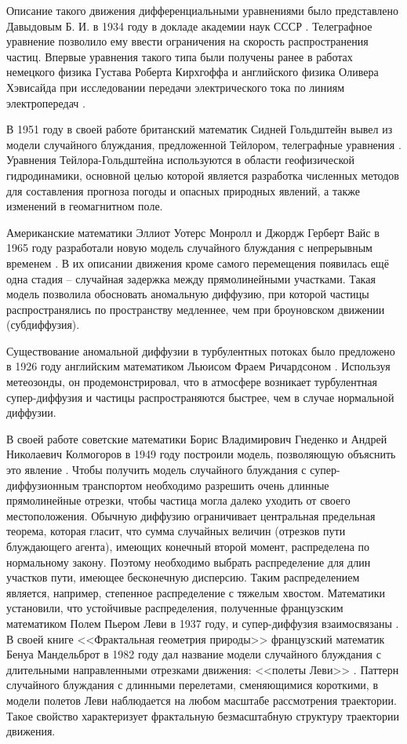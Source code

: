 Описание такого движения дифференциальными уравнениями было представлено Давыдовым Б. И. в 1934 году в докладе академии наук СССР \cite{davydov_diffusion_1934}. Телеграфное уравнение позволило ему ввести ограничения на скорость распространения частиц. Впервые уравнения такого типа были получены ранее в работах немецкого физика Густава Роберта Кирхгоффа и английского физика Оливера Хэвисайда при исследовании передачи электрического тока по линиям электропередач \cite{kirchhoff_ueber_1857}.

В 1951 году в своей работе британский математик Сидней Гольдштейн вывел из модели случайного блуждания, предложенной Тейлором, телеграфные уравнения \cite{goldstein_diffusion_1951}. Уравнения Тейлора-Гольдштейна используются в области геофизической гидродинамики, основной целью которой является разработка численных методов для составления прогноза погоды и опасных природных явлений, а также изменений в геомагнитном поле.

Американские математики Эллиот Уотерс Монролл и Джордж Герберт Вайс в 1965 году разработали новую модель случайного блуждания с непрерывным временем \cite{montroll_random_1965}. В их описании движения кроме самого перемещения появилась ещё одна стадия -- случайная задержка между прямолинейными участками. Такая модель позволила обосновать аномальную диффузию, при которой частицы распространялись по пространству медленнее, чем при броуновском движении (субдиффузия).

Существование аномальной диффузии в турбулентных потоках было предложено в 1926 году английским математиком Льюисом Фраем Ричардсоном \cite{richardson_atmospheric_1997}. Используя метеозонды, он продемонстрировал, что в атмосфере возникает турбулентная супер-диффузия и частицы распространяются быстрее, чем в случае нормальной диффузии.

В своей работе советские математики Борис Владимирович Гнеденко и Андрей Николаевич Колмогоров в 1949 году построили модель, позволяющую объяснить это явление \cite{gnedenko_predelnye_1949}. Чтобы получить модель случайного блуждания с супер-диффузионным транспортом необходимо разрешить очень длинные прямолинейные отрезки, чтобы частица могла далеко уходить от своего местоположения. Обычную диффузию ограничивает центральная предельная теорема, которая гласит, что сумма случайных величин (отрезков пути блуждающего агента), имеющих конечный второй момент, распределена по нормальному закону. Поэтому необходимо выбрать распределение для длин участков пути, имеющее бесконечную дисперсию. Таким распределением является, например, степенное распределение с тяжелым хвостом. Математики установили, что устойчивые распределения, полученные французским математиком Полем Пьером Леви в 1937 году, и супер-диффузия взаимосвязаны \cite{levy_theorie_1937}. В своей книге <<Фрактальная геометрия природы>> французский математик Бенуа Мандельброт в 1982 году дал название модели случайного блуждания с длительными направленными отрезками движения: <<полеты Леви>> \cite{mandelbrot_fractal_1983}. Паттерн случайного блуждания с длинными перелетами, сменяющимися короткими, в модели полетов Леви наблюдается на любом масштабе рассмотрения траектории. Такое свойство характеризует фрактальную безмасштабную структуру траектории движения.


